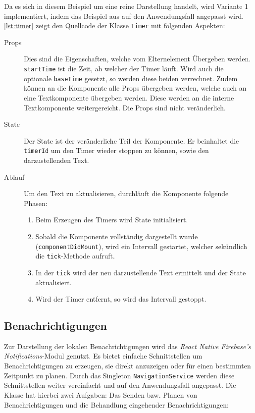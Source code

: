 Da es sich in diesem Beispiel um eine reine Darstellung handelt,
wird Variante 1 implementiert, indem das Beispiel aus \cite{Timersin85:online} auf den Anwendungsfall angepasst wird.
\autoref{lst:timer} zeigt den Quellcode der Klasse \texttt{Timer} mit folgenden Aspekten:
\begin{description}
    \item[Props] Dies sind die Eigenschaften, welche vom Elternelement Übergeben werden.
    \texttt{startTime} ist die Zeit, ab welcher der Timer läuft.
    Wird auch die optionale \texttt{baseTime} gesetzt, so werden diese beiden verrechnet.
    Zudem können an die Komponente alle Props übergeben werden, welche auch an eine Textkomponente übergeben werden.
    Diese werden an die interne Textkomponente weitergereicht.
    Die Props sind nicht veränderlich.
    \item[State] Der State ist der veränderliche Teil der Komponente.
    Er beinhaltet die \texttt{timerId} um den Timer wieder stoppen zu können,
    sowie den darzustellenden Text.
    \item[Ablauf]
    Um den Text zu aktualisieren, durchläuft die Komponente folgende Phasen:
    \begin{enumerate}
        \item Beim Erzeugen des Timers wird State initialisiert.
        \item Sobald die Komponente vollständig dargestellt wurde (\texttt{componentDidMount}),
        wird ein Intervall gestartet, welcher sekündlich die \texttt{tick}-Methode aufruft.
        \item In der \texttt{tick} wird der neu darzustellende Text ermittelt und der State aktualisiert.
        \item Wird der Timer entfernt, so wird das Intervall gestoppt.
    \end{enumerate}
\end{description}



\subsection{Benachrichtigungen}\label{sec:besonderheiten-benachrichtigung}
Zur Darstellung der lokalen Benachrichtigungen wird das \emph{React Native Firebase's Notifications}-Modul genutzt.
Es bietet einfache Schnittstellen um Benachrichtigungen zu erzeugen,
sie direkt anzuzeigen oder für einen bestimmten Zeitpunkt zu planen.
Durch das Singleton \texttt{NavigationService} werden diese Schnittstellen weiter vereinfacht und auf den Anwendungsfall angepasst.
Die Klasse hat hierbei zwei Aufgaben: Das Senden bzw. Planen von Benachrichtigungen und die Behandlung eingehender Benachrichtigungen:

